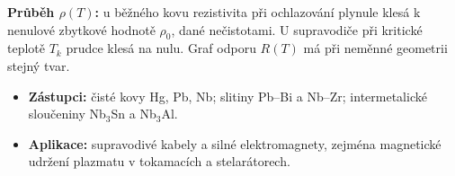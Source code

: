 \textbf{Průběh $\rho(T)$:} u běžného kovu rezistivita při ochlazování plynule klesá k nenulové zbytkové hodnotě $\rho_0$, dané nečistotami. U supravodiče při kritické teplotě $T_k$ prudce klesá na nulu. Graf odporu $R(T)$ má při neměnné geometrii stejný tvar.
\begin{itemize}
\item \textbf{Zástupci:} čisté kovy Hg, Pb, Nb; slitiny Pb--Bi a Nb--Zr; intermetalické sloučeniny Nb$_3$Sn a Nb$_3$Al.
\item \textbf{Aplikace:} supravodivé kabely a silné elektromagnety, zejména magnetické udržení plazmatu v tokamacích a stelarátorech.
\end{itemize}
